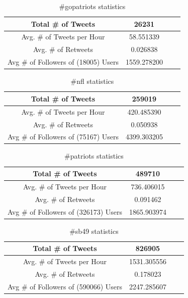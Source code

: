 \documentclass[12pt]{article}
\begin{document}
\begin{table}[!h]
	\centering
	\begin{tabular}{| c | c | c | c |}
		\hline 
		Total \# of Tweets & 26231 \\\hline
		Avg. \# of Tweets per Hour & 58.551339 \\\hline
		Avg. \# of Retweets & 0.026838 \\\hline
		Avg \# of Followers of (18005) Users & 1559.278200 \\\hline
	\end{tabular} 
	\caption{\#gopatriots statistics}
	\label{part1:tab1}
\end{table} 

\begin{table}[!h]
	\centering
	\begin{tabular}{| c | c | c | c |}
		\hline 
		Total \# of Tweets & 259019 \\\hline
		Avg. \# of Tweets per Hour & 420.485390 \\\hline
		Avg. \# of Retweets & 0.050938 \\\hline
		Avg \# of Followers of (75167) Users & 4399.303205 \\\hline
	\end{tabular} 
	\caption{\#nfl statistics}
	\label{part1:tab1}
\end{table} 

\begin{table}[!h]
	\centering
	\begin{tabular}{| c | c | c | c |}
		\hline 
		Total \# of Tweets & 489710 \\\hline
		Avg. \# of Tweets per Hour & 736.406015 \\\hline
		Avg. \# of Retweets & 0.091462 \\\hline
		Avg \# of Followers of (326173) Users & 1865.903974 \\\hline
	\end{tabular} 
	\caption{\#patriots statistics}
	\label{part1:tab1}
\end{table} 

\begin{table}[!h]
	\centering
	\begin{tabular}{| c | c | c | c |}
		\hline 
		Total \# of Tweets & 826905 \\\hline
		Avg. \# of Tweets per Hour & 1531.305556 \\\hline
		Avg. \# of Retweets & 0.178023 \\\hline
		Avg \# of Followers of (590066) Users & 2247.285607 \\\hline
	\end{tabular} 
	\caption{\#sb49 statistics}
	\label{part1:tab1}
\end{table} 
\end{document}
